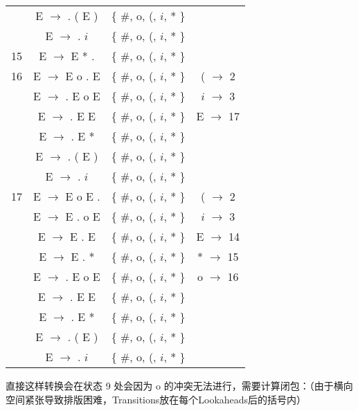 \begin{center}
\begin{longtable}{r|ccc}
      &  E $\rightarrow$ . ( E )  & \{ \#, o, (, $i$, * \}   &               \\
      &  E $\rightarrow$ . $i$        & \{ \#, o, (, $i$, * \}   &               \\
\hline
15    &  E $\rightarrow$ E * .      & \{ \#, o, (, $i$, * \}   &               \\
\hline
16    &  E $\rightarrow$ E o . E    & \{ \#, o, (, $i$, * \}   &  (  $\rightarrow$  2   \\
      &  E $\rightarrow$ . E o E    & \{ \#, o, (, $i$, * \}   &  $i$  $\rightarrow$  3   \\
      &  E $\rightarrow$ . E E        & \{ \#, o, (, $i$, * \}   &   E   $\rightarrow$  17  \\
      &  E $\rightarrow$ . E *      & \{ \#, o, (, $i$, * \}   &               \\
      &  E $\rightarrow$ . ( E )  & \{ \#, o, (, $i$, * \}   &               \\
      &  E $\rightarrow$ . $i$        & \{ \#, o, (, $i$, * \}   &               \\
\hline
17    &  E $\rightarrow$ E o E .    & \{ \#, o, (, $i$, * \}   &  (  $\rightarrow$  2   \\
      &  E $\rightarrow$ E . o E    & \{ \#, o, (, $i$, * \}   &  $i$  $\rightarrow$  3   \\
      &  E $\rightarrow$ E . E        & \{ \#, o, (, $i$, * \}   &   E   $\rightarrow$  14  \\
      &  E $\rightarrow$ E . *      & \{ \#, o, (, $i$, * \}   &  *  $\rightarrow$  15  \\
      &  E $\rightarrow$ . E o E    & \{ \#, o, (, $i$, * \}   &  o  $\rightarrow$  16  \\
      &  E $\rightarrow$ . E E        & \{ \#, o, (, $i$, * \}   &               \\
      &  E $\rightarrow$ . E *      & \{ \#, o, (, $i$, * \}   &               \\
      &  E $\rightarrow$ . ( E )  & \{ \#, o, (, $i$, * \}   &               \\
      &  E $\rightarrow$ . $i$        & \{ \#, o, (, $i$, * \}   &               \\
      \bottomrule
    \end{longtable}
\end{center}

直接这样转换会在状态 9 处会因为 o 的冲突无法进行，需要计算闭包：（由于横向空间紧张导致排版困难，Transitions放在每个Lookaheads后的括号内）

